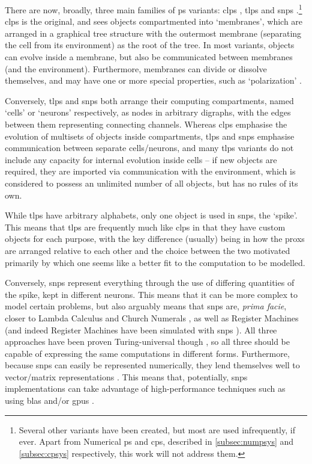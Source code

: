 There are now, broadly, three main families of \gls{ps} variants:  \gls{clps} \cite{Paun2001,Paun2002}, \gls{tlps} \cite{tMaPaPaRo01a,Martin-Vide2003} and \gls{snps} \cite{Ionescu2006}.\footnote{Several other variants have been created, but most are used infrequently, if ever.  Apart from Numerical \gls{ps} and \gls{cps}, described in \autoref{subsec:numpsys} and \autoref{subsec:cpsys} respectively, this work will not address them.}  \Gls{clps} is the original, and sees objects compartmented into `membranes', which are arranged in a graphical tree structure with the outermost membrane (separating the cell from its environment) as the root of the tree.  In most variants, objects can evolve inside a membrane, but also be communicated between membranes (and the environment).  Furthermore, membranes can divide or dissolve themselves, and may have one or more special properties, such as `polarization' \cite{Paun1999a}.

Conversely, \gls{tlps} and \gls{snps} both arrange their computing compartments, named `cells' or `neurons' respectively, as nodes in arbitrary digraphs, with the edges between them representing connecting channels.  Whereas \gls{clps} emphasise the evolution of multisets of objects inside compartments, \gls{tlps} and \gls{snps} emphasise communication between separate cells/neurons, and many \gls{tlps} variants do not include any capacity for internal evolution inside cells -- if new objects are required, they are imported via communication with the environment, which is considered to possess an unlimited number of all objects, but has no rules of its own.

While \gls{tlps} have arbitrary alphabets, only one object is used in \gls{snps}, the `spike'.  This means that \gls{tlps} are frequently much like \gls{clps} in that they have custom objects for each purpose, with the key difference (usually) being in how the \glspl{prox} are arranged relative to each other and the choice between the two motivated primarily by which one seems like a better fit to the computation to be modelled.

Conversely, \gls{snps} represent everything through the use of differing quantities of the spike, kept in different neurons.  This means that it can be more complex to model certain problems, but also arguably means that \gls{snps} are, \textit{prima facie}, closer to Lambda Calculus \cite{Barendregt1984} and Church Numerals \fxerror[inline]{[ref]}, as well as Register Machines \fxerror[inline]{[ref]} (and indeed Register Machines have been simulated with \gls{snps} \fxerror[inline]{[ref]}).  All three approaches have been proven Turing-universal though \fxerror[inline]{[ref]}, so all three should be capable of expressing the same computations in different forms.  Furthermore, because \gls{snps} can easily be represented numerically, they lend themselves well to vector/matrix representations \cite{Zeng2010}.  This means that, potentially, \gls{snps} implementations can take advantage of high-performance techniques such as using \gls{blas} and/or \glspl{gpu} \cite{Aboy2019}.

